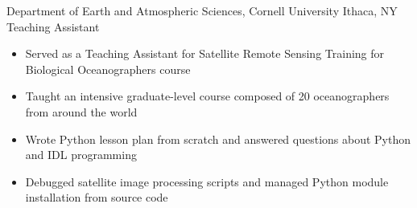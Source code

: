 
        {Department of Earth and Atmospheric Sciences, Cornell University}
        {Ithaca, NY}
        {Teaching Assistant}
        {}{
    \begin{itemize}
        \item Served as a Teaching Assistant for Satellite Remote Sensing Training for Biological Oceanographers course
        \item Taught an intensive graduate-level course composed of 20 oceanographers from around the world
        \item Wrote Python lesson plan from scratch and answered questions about Python and IDL programming
        \item Debugged satellite image processing scripts and managed Python module installation from source code
    \end{itemize}
}
